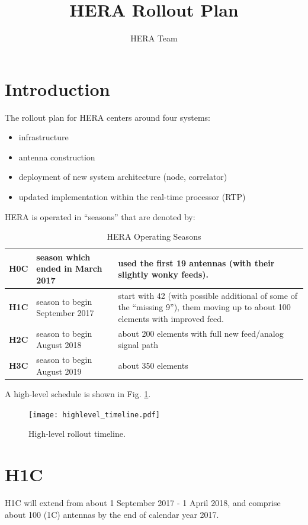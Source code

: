 \documentclass{article}
\begin{document}
\author{HERA Team}
\title{HERA Rollout Plan}
\maketitle

\setcounter{section}{-1}
\section{Introduction}
The rollout plan for HERA centers around four systems:
\begin{itemize}
\item infrastructure
\item antenna construction
\item deployment of new system architecture (node, correlator)
\item updated implementation within the real-time processor (RTP)
\end{itemize}

HERA is operated in ``seasons'' that are denoted by:

\begin{table}[H]
\caption{HERA Operating Seasons}
\begin{tabular}{p{0.5in} p{2.2in} p{3.5in}} \hline
{\bf H0C} & season which ended in March 2017 & used the first 19 antennas (with their slightly wonky feeds). \\ \hline
{\bf H1C} & season to begin September 2017 & start with 42 (with possible additional of some of the ``missing 9''), them moving up to about 100 elements with improved feed.\\ \hline
{\bf H2C} & season to begin August 2018 & about 200 elements with full new feed/analog signal path\\ \hline
{\bf H3C} & season to begin August 2019 & about 350 elements \\ \hline
\end{tabular}
\end{table}

A high-level schedule is shown in Fig. \ref{Fig:rollout}.

\begin{figure}
\texttt{[image: highlevel\_timeline.pdf]} %
\caption{High-level rollout timeline.}
\label{Fig:rollout}
\end{figure}

\section{H1C}
H1C will extend from about 1 September 2017 - 1 April 2018, and comprise about 100 (1C) antennas by the end of calendar year 2017.
\end{document}
